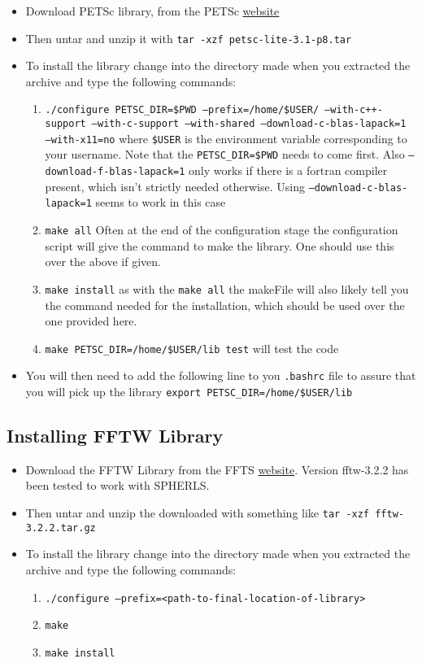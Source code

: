 \documentclass[11pt]{article}
\begin{document}
\begin{itemize}
\item Download PETSc library, from the PETSc \href{http://www.mcs.anl.gov/petsc/download/index.html}{website}
\item Then untar and unzip it with {\tt tar -xzf petsc-lite-3.1-p8.tar}
\item To install the library change into the directory made when you extracted the archive and type the following commands:
\begin{enumerate}
\item {\tt ./configure PETSC\_DIR=\$PWD --prefix=/home/\$USER/ --with-c++-support --with-c-support --with-shared --download-c-blas-lapack=1 --with-x11=no} where {\tt \$USER} is the environment variable corresponding to your username.  Note that the {\tt PETSC\_DIR=\$PWD} needs to come first. Also {\tt --download-f-blas-lapack=1} only works if there is a fortran compiler present, which isn't strictly needed otherwise. Using {\tt --download-c-blas-lapack=1} seems to work in this case
\item {\tt make all} Often at the end of the configuration stage the configuration script will give the command to make the library. One should use this over the above if given.
\item {\tt make install} as with the {\tt make all} the makeFile will also likely tell you the command needed for the installation, which should be used over the one provided here.
\item {\tt make PETSC\_DIR=/home/\$USER/lib test} will test the code
\end{enumerate}
\item You will then need to add the following line to you {\tt .bashrc} file to assure that you will pick up the library {\tt export PETSC\_DIR=/home/\$USER/lib}
\end{itemize}

\subsection{Installing FFTW Library}
\begin{itemize}
\item Download the FFTW Library from the FFTS \href{http://www.fftw.org/download.html}{website}. Version fftw-3.2.2 has been tested to work with SPHERLS.
\item Then untar and unzip the downloaded with something like {\tt tar -xzf fftw-3.2.2.tar.gz}
\item To install the library change into the directory made when you extracted the archive and type the following commands:
\begin{enumerate}
\item {\tt ./configure --prefix=<path-to-final-location-of-library>}
\item {\tt make}
\item {\tt make install}
\end{enumerate}
\end{itemize}
\end{document}
